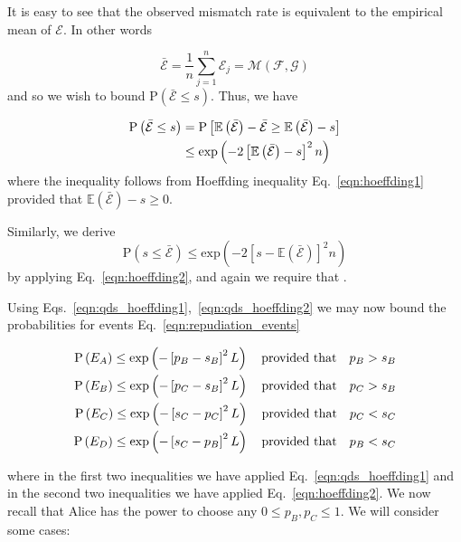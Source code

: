 It is easy to see that the observed mismatch rate is equivalent to the empirical mean of $\mathcal{E}$. In other words

\begin{equation}
\bar{\mathcal{E}} = \frac{1}{n} \sum_{j=1}^n \mathcal{E}_j = \mathcal{M}\left(\mathcal{F}, \mathcal{G}\right)
\end{equation}
and so we wish to bound $\text{P}\left(\bar{\mathcal{E}} \le s\right)$. Thus, we have

\begin{align}\label{eqn:qds_hoeffding1}
\text{P}\left(\bar{\mathcal{E}} \le s \right) &= \text{P}\left[\mathbb{E}\left(\bar{\mathcal{E}}\right) - \bar{\mathcal{E}} \ge \mathbb{E}\left(\bar{\mathcal{E}}\right) - s\right] \notag \\
&\le \text{exp}\left(- 2 \left[\mathbb{E}\left(\bar{\mathcal{E}}\right) - s\right]^2 n \right)
\end{align}
where the inequality follows from Hoeffding inequality Eq.~\ref{eqn:hoeffding1} provided that $\mathbb{E}\left(\bar{\mathcal{E}}\right) - s \ge 0$.

Similarly, we derive
\begin{equation}\label{eqn:qds_hoeffding2}
\text{P}\left(s \le \bar{\mathcal{E}}\right) \le \text{exp}\left( - 2 \left[s - \mathbb{E}\left(\bar{\mathcal{E}}\right)\right]^2 n\right)
\end{equation}
by applying Eq.~\ref{eqn:hoeffding2}, and again we require that .

Using Eqs.~\ref{eqn:qds_hoeffding1},~\ref{eqn:qds_hoeffding2} we may now bound the probabilities for events Eq.~\ref{eqn:repudiation_events}

\begin{align}\label{eqn:qds_repudiation_events_probs}
\text{P}\left(E_A\right) \le \text{exp}\left( -\left[p_B - s_B\right]^2 L \right) \qq{provided that} p_B > s_B \notag \\
\text{P}\left(E_B\right) \le \text{exp}\left( -\left[p_C - s_B\right]^2 L \right) \qq{provided that} p_C > s_B \notag \\
\text{P}\left(E_C\right) \le \text{exp}\left( -\left[s_C - p_C\right]^2 L \right) \qq{provided that} p_C < s_C \notag \\
\text{P}\left(E_D\right) \le \text{exp}\left( -\left[s_C - p_B\right]^2 L \right) \qq{provided that} p_B < s_C
\end{align}

\noindent where in the first two inequalities we have applied Eq.~\ref{eqn:qds_hoeffding1} and in the second two inequalities we have applied Eq.~\ref{eqn:hoeffding2}. We now recall that Alice has the power to choose any $0 \le p_B, p_C \le 1$. We will consider some cases:

